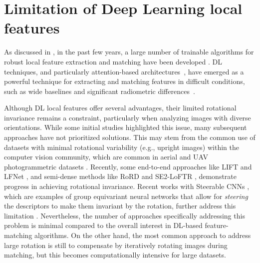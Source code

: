 
\section{Limitation of Deep Learning local features}\label{sec:5:limitation_dl_feats}

As discussed in , in the past few years, a large number of trainable algorithms for robust local feature extraction and matching have been developed \citep{Yao_2021, remondino2022_at_with_dl}.
DL techniques, and particularly attention-based architectures~\citep{vaswani2023attention}, have emerged as a powerful technique for extracting and matching features in difficult conditions, such as wide baselines and significant radiometric differences~\citep{jin_image_2021, Yao_2021}.

Although DL local features offer several advantages, their limited rotational invariance remains a constraint, particularly when analyzing images with diverse orientations. 
While some initial studies highlighted this issue, many subsequent approaches have not prioritized solutions. 
This may stem from the common use of datasets with minimal rotational variability (e.g., upright images) within the computer vision community, which are common in aerial and UAV photogrammetric datasets \cite{Bkman2022_se2loftr}. 
Recently, some end-to-end approaches like LIFT \citep{yi2016lift} and LFNet \citep{ono2018lfnet}, and semi-dense methods like RoRD \citep{parihar2022rord} and SE2-LoFTR \citep{Bkman2022_se2loftr}, demonstrate progress in achieving rotational invariance. 
Recent works with Steerable CNNs \citep{cohen2016steerable}, which are examples of group equivariant neural networks that allow for \textit{steering} the descriptors to make them invariant by the rotation, further address this limitation \cite{Bkman2022_se2loftr, bokman2023steerers}.
Nevertheless, the number of approaches specifically addressing this problem is minimal compared to the overall interest in DL-based feature-matching algorithms.
On the other hand, the most common approach to address large rotation is still to compensate by iteratively rotating images during matching, but this becomes computationally intensive for large datasets.

